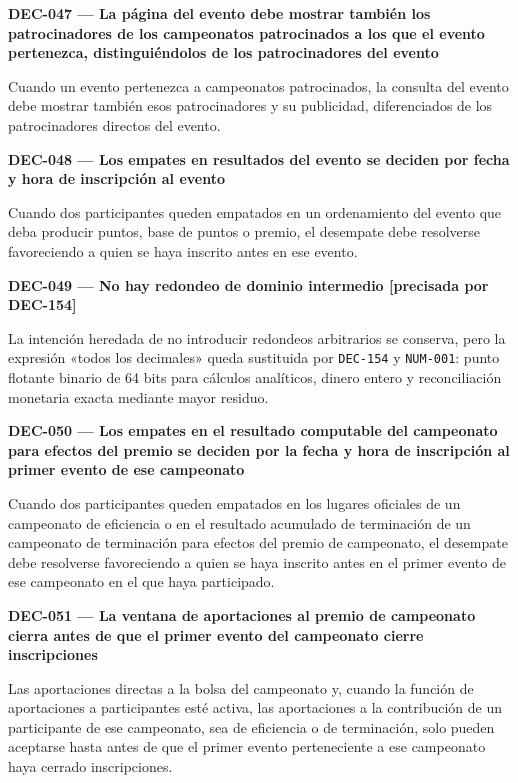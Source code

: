 \documentclass[10pt,letterpaper]{article}
\begin{document}
\noindent\textbf{DEC-047 --- La página del evento debe mostrar también los patrocinadores de los campeonatos patrocinados a los que el evento pertenezca, distinguiéndolos de los patrocinadores del evento}\par
Cuando un evento pertenezca a campeonatos patrocinados, la consulta del evento debe mostrar también esos patrocinadores y su publicidad, diferenciados de los patrocinadores directos del evento.\par\vspace{0.45em}
\noindent\textbf{DEC-048 --- Los empates en resultados del evento se deciden por fecha y hora de inscripción al evento}\par
Cuando dos participantes queden empatados en un ordenamiento del evento que deba producir puntos, base de puntos o premio, el desempate debe resolverse favoreciendo a quien se haya inscrito antes en ese evento.\par\vspace{0.45em}
\noindent\textbf{DEC-049 --- No hay redondeo de dominio intermedio [precisada por DEC-154]}\par
La intención heredada de no introducir redondeos arbitrarios se conserva, pero la expresión «todos los decimales» queda sustituida por \texttt{DEC-154} y \texttt{NUM-001}: punto flotante binario de 64 bits para cálculos analíticos, dinero entero y reconciliación monetaria exacta mediante mayor residuo.\par\vspace{0.45em}
\noindent\textbf{DEC-050 --- Los empates en el resultado computable del campeonato para efectos del premio se deciden por la fecha y hora de inscripción al primer evento de ese campeonato}\par
Cuando dos participantes queden empatados en los lugares oficiales de un campeonato de eficiencia o en el resultado acumulado de terminación de un campeonato de terminación para efectos del premio de campeonato, el desempate debe resolverse favoreciendo a quien se haya inscrito antes en el primer evento de ese campeonato en el que haya participado.\par\vspace{0.45em}
\noindent\textbf{DEC-051 --- La ventana de aportaciones al premio de campeonato cierra antes de que el primer evento del campeonato cierre inscripciones}\par
Las aportaciones directas a la bolsa del campeonato y, cuando la función de aportaciones a participantes esté activa, las aportaciones a la contribución de un participante de ese campeonato, sea de eficiencia o de terminación, solo pueden aceptarse hasta antes de que el primer evento perteneciente a ese campeonato haya cerrado inscripciones.\par\vspace{0.45em}
\end{document}
